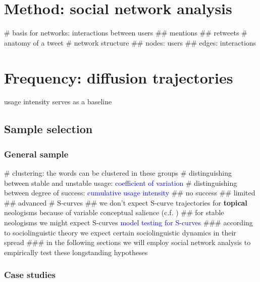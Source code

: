 \documentclass[
  a4paper,
  ]{scrartcl}
\newcommand{\hw}[1]{\textbf{#1}}
\newcommand{\mtrc}[1]{\textcolor{blue}{#1}}
\begin{document}
\section{Method: social network analysis}

  \begin{easylist}[itemize]
    # basis for networks: interactions between users
      ## mentions
      ## retweets
    # anatomy of a tweet
    # network structure
      ## nodes: users
      ## edges: interactions
  \end{easylist}

\section{Frequency: diffusion trajectories}

  usage intensity serves as a baseline

  \subsection{Sample selection}

    \subsubsection{General sample}

      \begin{easylist}[itemize]
        # clustering: the words can be clustered in these groups \parencite{Kerremans2015}
        # distinguishing between stable and unstable usage: \mtrc{coefficient of variation}
        # distinguishing between degree of success: \mtrc{cumulative usage intensity}
          ## no success
          ## limited
          ## advanced
      # S-curves
        ## we don't expect S-curve trajectories for \hw{topical} neologisms because of variable conceptual salience (c.f. \cite{Nini2017})
        ## for stable neologisms we might expect S-curves \mtrc{model testing for S-curves}
          ### according to sociolinguistic theory we expect certain sociolinguistic dynamics in their spread
          ### in the following sections we will employ social network analysis to empirically test these longstanding hypotheses
      \end{easylist}

    \subsubsection{Case studies}
\end{document}
